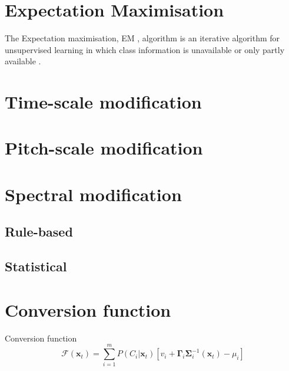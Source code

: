 \section{Expectation Maximisation} %
\label{sec:expectation_maximisation}
The Expectation maximisation, EM , algorithm is an iterative algorithm for unsupervised learning in which class information is unavailable or only partly available \cite{taletek}.

\section{Time-scale modification} %
\label{sec:time_scale_modification}


\section{Pitch-scale modification} %
\label{sec:pitch_scale_modification}


\section{Spectral modification} %
\label{sec:spectral_modification}

\subsection{Rule-based} %
\label{sub:rule_based}


\subsection{Statistical} %
\label{sub:statistical}



\section{Conversion function} %
\label{sec:conversion_function}
Conversion function \cite{stylianou95}
\begin{equation}
	\label{eq:conversion_function}
	\mathcal{F}(\mathbf{x}_t) = \sum_{i=1}^{m}P(C_i \vert \mathbf{x}_t)[v_i + \boldsymbol{\Gamma}_i \mathbf{\Sigma}_i^{-1}(\mathbf{x}_t)-\mu_i]
\end{equation}

